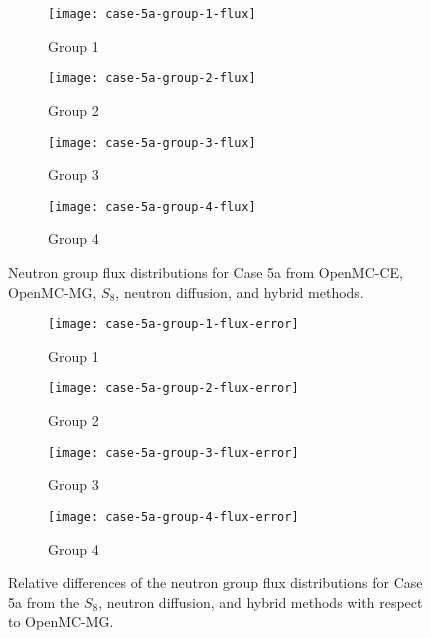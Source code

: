 \begin{figure}[htb!]
  \centering
  \begin{subfigure}[t]{.49\textwidth}
    \centering
    \texttt{[image: case-5a-group-1-flux]}
    \caption{Group 1}
    \label{fig:c5ag1}
  \end{subfigure}
  \hfill
  \begin{subfigure}[t]{.49\textwidth}
    \centering
    \texttt{[image: case-5a-group-2-flux]}
    \caption{Group 2}
    \label{fig:c5ag2}
  \end{subfigure}
  \begin{subfigure}[t]{.49\textwidth}
    \centering
    \texttt{[image: case-5a-group-3-flux]}
    \caption{Group 3}
    \label{fig:c5ag3}
  \end{subfigure}
  \hfill
  \begin{subfigure}[t]{.49\textwidth}
    \centering
    \texttt{[image: case-5a-group-4-flux]}
    \caption{Group 4}
    \label{fig:c5ag4}
  \end{subfigure}
  \caption{Neutron group flux distributions for Case 5a from OpenMC-CE, OpenMC-MG, $S_8$, neutron
  diffusion, and hybrid methods.}
  \label{fig:c5aflux}
\end{figure}
%
\begin{figure}[htb!]
  \centering
  \begin{subfigure}[t]{.49\textwidth}
    \centering
    \texttt{[image: case-5a-group-1-flux-error]}
    \caption{Group 1}
    \label{fig:c5ag1e}
  \end{subfigure}
  \hfill
  \begin{subfigure}[t]{.49\textwidth}
    \centering
    \texttt{[image: case-5a-group-2-flux-error]}
    \caption{Group 2}
    \label{fig:c5ag2e}
  \end{subfigure}
  \begin{subfigure}[t]{.49\textwidth}
    \centering
    \texttt{[image: case-5a-group-3-flux-error]}
    \caption{Group 3}
    \label{fig:c5ag3e}
  \end{subfigure}
  \hfill
  \begin{subfigure}[t]{.49\textwidth}
    \centering
    \texttt{[image: case-5a-group-4-flux-error]}
    \caption{Group 4}
    \label{fig:c5ag4e}
  \end{subfigure}
  \caption{Relative differences of the neutron group flux distributions for Case 5a from the $S_8$,
    neutron diffusion, and hybrid methods with respect to OpenMC-MG.}
  \label{fig:c5afluxe}
\end{figure}
